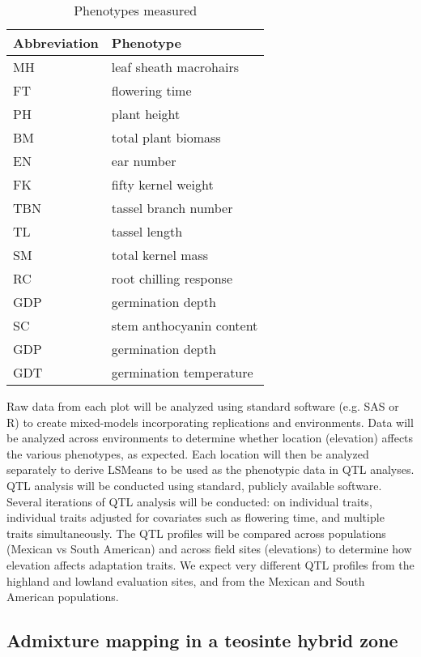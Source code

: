 \begin{wraptable}{r}{8cm}
\caption{Phenotypes measured}\label{phenos}
\begin{tabular}{ll}\\\toprule  
{\bf Abbreviation} & {\bf Phenotype}  \\\midrule
MH & leaf sheath macrohairs \\
FT & flowering time \\
PH & plant height \\
BM & total plant biomass \\
EN & ear number \\
FK & fifty kernel weight \\
TBN & tassel branch number \\
TL & tassel length \\
SM & total kernel mass \\
RC & root chilling response \\
GDP & germination depth \\
SC & stem anthocyanin content \\
GDP & germination depth \\
GDT & germination temperature \\\bottomrule
\end{tabular}
\end{wraptable} 


Raw data from each plot will be analyzed using standard software (e.g. SAS or R) to create mixed-models incorporating replications and environments.  Data will be analyzed across environments to determine whether location (elevation) affects the various phenotypes, as expected.  Each location will then be analyzed separately to derive LSMeans to be used as the phenotypic data in QTL analyses.  QTL analysis will be conducted using standard, publicly available software.  Several iterations of QTL analysis will be conducted: on individual traits, individual traits adjusted for covariates such as flowering time, and multiple traits simultaneously.  The QTL profiles will be compared across populations (Mexican vs South American) and across field sites (elevations) to determine how elevation affects adaptation traits.  We expect very different QTL profiles from the highland and lowland evaluation sites, and from the Mexican and South American populations.

\subsection{Admixture mapping in a teosinte hybrid zone}


